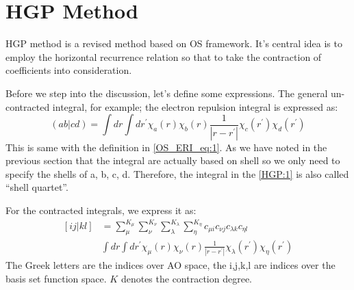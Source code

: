 % 
%
%
%
%
\section{HGP Method}
%
%
%
%
HGP method\cite{HGP} is a revised method based on OS\cite{OS1986} framework.
It's central idea is to employ the horizontal recurrence relation so that 
to take the contraction of coefficients into consideration. 

Before we step into the discussion, let's define some expressions. The general
un-contracted integral, for example; the electron repulsion integral is
expressed as:
\begin{equation}
 (ab|cd) = \int dr \int dr^{'} \chi_{a}(r)\chi_{b}(r)\frac{1}{|r-r^{'}|}
\chi_{c}(r^{'})\chi_{d}(r^{'})
\label{HGP:1}
\end{equation}
This is same with the definition in \ref{OS_ERI_eq:1}. As we have noted in the
previous section that the integral are actually based on shell so we only need
to specify the shells of a, b, c, d. Therefore, the integral in the \ref{HGP:1}
is also called ``shell quartet''.

For the contracted integrals, we express it as:
\begin{align}
 \label{HGP:2}
[ij|kl] &=
\sum_{\mu}^{K_{\mu}}\sum_{\nu}^{K_{\nu}}\sum_{\lambda}^{K_{\lambda}}
\sum_{\eta}^{K_{\eta}}c_{\mu i}c_{\nu j}c_{\lambda k}c_{\eta l} \nonumber \\
&\int dr \int dr^{'} \chi_{\mu}(r)\chi_{\nu}(r)\frac{1}{|r-r^{'}|}
\chi_{\lambda}(r^{'})\chi_{\eta}(r^{'})
\end{align}
The Greek letters are the indices over AO space, the i,j,k,l are indices over
the basis set function space. $K$ denotes the contraction degree.
 

